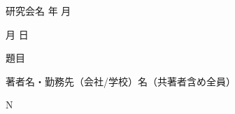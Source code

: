 \documentclass[a4paper,uplatex,12pt]{jsarticle}
\begin{document}
\vspace*{-7.5zh}\hspace*{12zw}
研究会名
\hspace*{9zw}
年
\hspace*{2.5zw}
月

\vspace{3zh}

\begin{minipage}[t]{0.5\textwidth}
	\hspace*{-3zw}
	\phantom{投稿締切日}
	月
	\phantom{月}\hspace{1zw}
	日
	\phantom{日}
\end{minipage}
\begin{minipage}[t]{0.5\textwidth}
	\phantom{EMM-000}
\end{minipage}	

\vspace*{6zh}
題目

\vspace*{7zh}
著者名・勤務先（会社/学校）名（共著者含め全員）

\vspace*{2zh}
\hspace*{1.5zw}
N
\phantom{枚}
\end{document}
